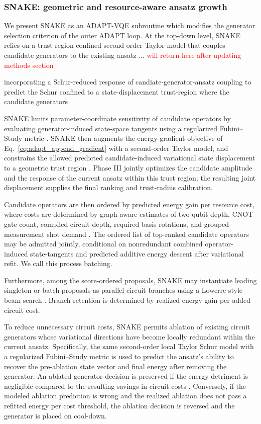 \documentclass[
  reprint,
  amsmath,
  amssymb,
  aps,
  pra,
  nofootinbib,
  superscriptaddress,
  floatfix
]{revtex4-2}
\begin{document}
%
\subsubsection{\textsc{SNAKE}: geometric and resource-aware ansatz growth}
We present \textsc{SNAKE} as an ADAPT-VQE subroutine which modifies the generator selection criterion of the outer ADAPT loop. At the top-down level, SNAKE relies on a trust-region confined second-order Taylor model that couples candidate generators to the existing ansatz ... \textcolor{red}{will return here after updating methods section}

incorporating a Schur-reduced response of candiate-generator-ansatz coupling to predict the Schur
confined to a state-displacement trust-region where the candidate generators 

\textsc{SNAKE} limits parameter-coordinate sensitivity of candidate operators by evaluating generator-induced state-space tangents using a regularized Fubini--Study metric \cite{Sohail2026GeoADAPT}. \textsc{SNAKE} then augments the energy-gradient objective of Eq.~\eqref{eq:adapt_append_gradient} with a second-order Taylor model, and constrains the allowed predicted candidate-induced variational state displacement to a geometric trust region \cite{Nocedal2006TrustRegion}. Phase III jointly optimizes the candidate amplitude and the response of the current ansatz within this trust region; the resulting joint displacement supplies the final ranking and trust-radius calibration.

Candidate operators are then ordered by predicted energy gain per resource cost, where costs
are determined by graph-aware estimates of two-qubit depth, CNOT gate count, compiled circuit depth, required basis rotations, and grouped-measurement shot demand \cite{Verteletskyi2020CliqueCover,Yen2020CompatibleMeasurements,Ikhtiarudin2025ShotEfficient}.
The ordered list of top-ranked candidate operators may be admitted jointly, conditional on nonredundant combined operator-induced state-tangents and predicted additive energy descent after variational refit. We call this process batching.

Furthermore, among the score-ordered proposals, \textsc{SNAKE} may
instantiate leading singleton or batch proposals as parallel circuit branches
using a Lowerre-style beam search \cite{Lowerre1976Beam}. Branch retention is
determined by realized energy gain per added circuit cost.


To reduce unnecessary circuit costs, \textsc{SNAKE} permits ablation of existing circuit generators whose variational directions have become locally redundant within the current ansatz. Specifically, the same second-order local Taylor Schur model with a regularized Fubini--Study metric is used to predict the ansatz's ability to recover the pre-ablation state vector and final energy after removing the generator. An ablated generator decision is preserved if the energy detriment is negligible compared to the resulting savings in circuit costs \cite{Vaquero2025PrunedADAPT}. Conversely, if the modeled ablation prediction is wrong and the realized ablation does not pass a refitted energy per cost threshold, the ablation decision is reversed and the generator is placed on cool-down.
\end{document}
